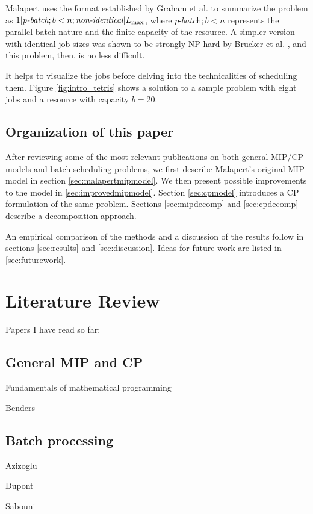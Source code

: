 \documentclass[13pt, letterpaper, twoside]{book}
\begin{document}
Malapert uses the format established by Graham et al. \cite{graham_notation} to
summarize the problem as $1|\textit{p-batch}; b < n;
\textit{non-identical}|L_{\text{max}}$, where $\textit{p-batch};b<n$ represents the
parallel-batch nature and the finite capacity of the resource. A simpler version
with identical job sizes was shown to be strongly NP-hard by Brucker et al.
\cite{brucker}, and this problem, then, is no less difficult.

It helps to visualize the jobs before delving into the technicalities of
scheduling them. Figure \ref{fig:intro_tetris} shows a solution to a sample
problem with eight jobs and a resource with capacity $b = 20$.


\section{Organization of this paper}
After reviewing some of the most relevant publications on both general MIP/CP models and
batch scheduling problems, we first describe Malapert's original MIP model in
section \ref{sec:malapertmipmodel}. We then present possible improvements to the
model in \ref{sec:improvedmipmodel}. Section \ref{sec:cpmodel} introduces a CP formulation of the same
problem. Sections \ref{sec:mipdecomp} and \ref{sec:cpdecomp} describe a
decomposition approach.

An empirical comparison of the methods and a discussion of the results follow in
sections \ref{sec:results} and \ref{sec:discussion}. Ideas for future work are
listed in \ref{sec:futurework}.



\chapter{Literature Review}
Papers I have read so far:
\section{General MIP and CP}
  \begin{alist}
    \item{Fundamentals of mathematical programming}
    \item{Benders}
  \end{alist}
\section{Batch processing}
\begin{alist}
    \item{Azizoglu}
    \item{Dupont}
    \item{Sabouni}
    \end{alist}
\end{document}
